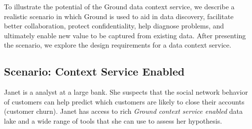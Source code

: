 \documentclass{sig-alternate}
\begin{document}

To illustrate the potential of the Ground data context service, we describe a realistic scenario in which Ground 
is used to aid in data discovery, facilitate better collaboration, protect confidentiality, help diagnose problems, and ultimately enable new value to be captured from existing data.
After presenting the scenario, we explore the design requirements for a data context service.



\subsection{Scenario: Context Service Enabled }
\label{sec:scenarios}


Janet is a 
analyst at a large bank. 
She suspects that the social network behavior of customers can help predict which customers are likely to close their accounts (customer churn).
Janet has access to rich \emph{Ground context service enabled} data lake and a wide range of tools that she can use 
to assess her hypothesis. 
\end{document}
